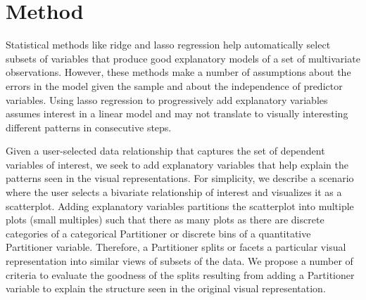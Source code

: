 \section{Method}
Statistical methods like ridge and lasso regression help automatically select subsets of variables that produce good explanatory models of a set of multivariate observations. However, these methods make a number of assumptions about the errors in the model given the sample and about the independence of predictor variables. Using lasso regression to progressively add explanatory variables assumes interest in a linear model and may not translate to visually interesting different patterns in consecutive steps. 

Given a user-selected data relationship that captures the set of dependent variables of interest, we seek to add explanatory variables that help explain the patterns seen in the visual representations. For simplicity, we describe a scenario where the user selects a bivariate relationship of interest and visualizes it as a scatterplot. Adding explanatory variables partitions the scatterplot into multiple plots (small multiples) such that there as many plots as there are discrete categories of a categorical Partitioner or discrete bins of a quantitative Partitioner variable. Therefore, a Partitioner splits or facets a particular visual representation into similar views of subsets of the data. We propose a number of criteria to evaluate the goodness of the splits resulting from adding a Partitioner variable to explain the structure seen in the original visual representation.

